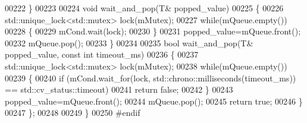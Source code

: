 \begin{DoxyCode}
00222     \}
00223 
00224     \textcolor{keywordtype}{void} wait_and_pop(T& popped\_value)
00225     \{
00226         std::unique\_lock<std::mutex> lock(mMutex);
00227         \textcolor{keywordflow}{while}(mQueue.empty())
00228         \{
00229             mCond.wait(lock);
00230         \}
00231         popped\_value=mQueue.front();
00232         mQueue.pop();
00233     \}
00234 
00235     \textcolor{keywordtype}{bool} wait_and_pop(T& popped\_value, \textcolor{keyword}{const} \textcolor{keywordtype}{int} timeout_ms)
00236     \{
00237         std::unique\_lock<std::mutex> lock(mMutex);
00238         \textcolor{keywordflow}{while}(mQueue.empty())
00239         \{
00240             \textcolor{keywordflow}{if} (mCond.wait\_for(lock, std::chrono::milliseconds(timeout\_ms)) == std::cv\_status::timeout)
00241                 \textcolor{keywordflow}{return} \textcolor{keyword}{false};
00242         \}
00243         popped\_value=mQueue.front();
00244         mQueue.pop();
00245         \textcolor{keywordflow}{return} \textcolor{keyword}{true};
00246     \}
00247 \};
00248 
00249 \}
00250 \textcolor{preprocessor}{#endif}
\end{DoxyCode}

